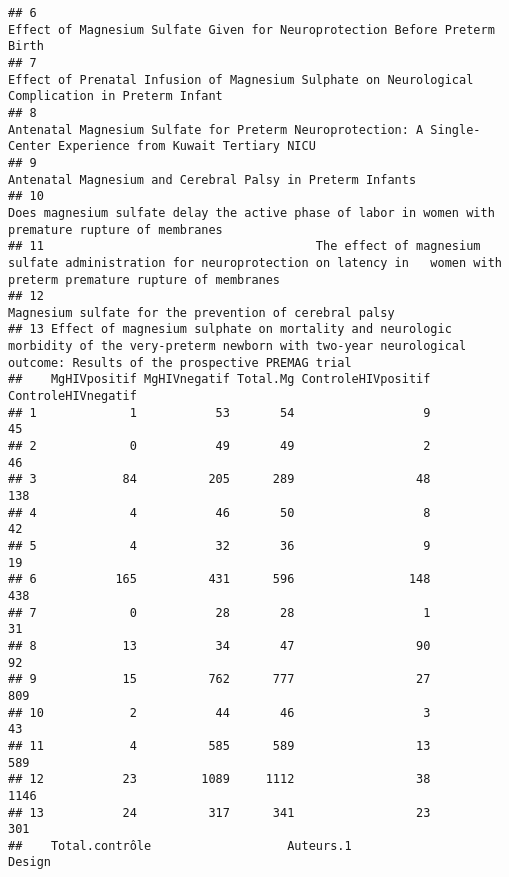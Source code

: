 \documentclass[
]{article}
\begin{document}
\begin{verbatim}
## 6                                                                                                  Effect of Magnesium Sulfate Given for Neuroprotection Before Preterm Birth 
## 7                                                                            Effect of Prenatal Infusion of Magnesium Sulphate on Neurological Complication in Preterm Infant 
## 8                                                               Antenatal Magnesium Sulfate for Preterm Neuroprotection: A Single-Center Experience from Kuwait Tertiary NICU 
## 9                                                                                                                   Antenatal Magnesium and Cerebral Palsy in Preterm Infants 
## 10                                                                       Does magnesium sulfate delay the active phase of labor in women with premature rupture of membranes  
## 11                                      The effect of magnesium sulfate administration for neuroprotection on latency in   women with preterm premature rupture of membranes  
## 12                                                                                                                     Magnesium sulfate for the prevention of cerebral palsy 
## 13 Effect of magnesium sulphate on mortality and neurologic morbidity of the very-preterm newborn with two-year neurological outcome: Results of the prospective PREMAG trial 
##    MgHIVpositif MgHIVnegatif Total.Mg ControleHIVpositif ControleHIVnegatif 
## 1             1           53       54                  9                 45 
## 2             0           49       49                  2                 46 
## 3            84          205      289                 48                138 
## 4             4           46       50                  8                 42 
## 5             4           32       36                  9                 19 
## 6           165          431      596                148                438 
## 7             0           28       28                  1                 31 
## 8            13           34       47                 90                 92 
## 9            15          762      777                 27                809 
## 10            2           44       46                  3                 43 
## 11            4          585      589                 13                589 
## 12           23         1089     1112                 38               1146 
## 13           24          317      341                 23                301 
##    Total.contrôle                   Auteurs.1                   Design 

\end{verbatim}
\end{document}

